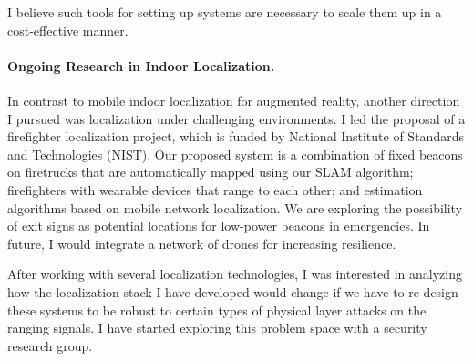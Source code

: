 \documentclass[10pt]{article}
\begin{document}
I believe such tools for setting up systems are necessary to scale them up in a cost-effective manner.

\paragraph{Ongoing Research in Indoor Localization. }
In contrast to mobile indoor localization for augmented reality, another direction I pursued was localization under challenging environments.  
I led the proposal of a firefighter localization project, which is funded by National Institute of Standards and Technologies (NIST). Our proposed system is a combination of fixed beacons on firetrucks that are automatically mapped using our SLAM algorithm; firefighters with wearable devices that range to each other; and estimation algorithms based on mobile network localization. We are exploring the possibility of exit signs as potential locations for low-power beacons in emergencies. 
In future, I would integrate a network of drones for increasing resilience. 

After working with several localization technologies, I was interested in analyzing how the localization stack I have developed would change if we have to re-design these systems to be robust to certain types of physical layer attacks on the ranging signals.
I have started exploring this problem space with a security research group. %
\end{document}
